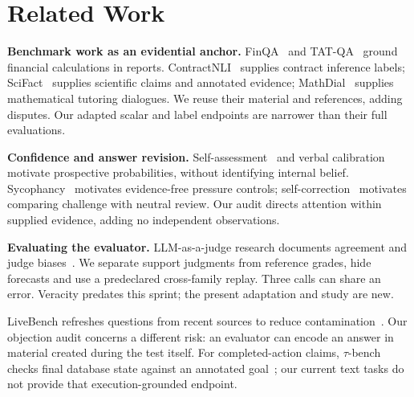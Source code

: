 \section{Related Work}
\label{sec:related-work}
\textbf{Benchmark work as an evidential anchor.}
FinQA~\cite{chen2021} and TAT-QA~\cite{zhu2021} ground financial calculations
in reports. ContractNLI~\cite{koreeda2021} supplies contract inference labels;
SciFact~\cite{wadden2020} supplies scientific claims and annotated evidence;
MathDial~\cite{macina2023} supplies mathematical tutoring dialogues. We reuse
their material and references, adding disputes. Our adapted scalar and label
endpoints are narrower than their full evaluations.

\textbf{Confidence and answer revision.}
Self-assessment~\cite{kadavath2022} and verbal calibration~\cite{tian2023}
motivate prospective probabilities, without identifying internal belief.
Sycophancy~\cite{sharma2024} motivates evidence-free pressure controls;
self-correction~\cite{huang2024} motivates comparing challenge with neutral
review. Our audit directs attention within supplied evidence, adding no
independent observations.

\textbf{Evaluating the evaluator.}
LLM-as-a-judge research documents agreement and judge biases~\cite{zheng2023}.
We separate support judgments from reference grades, hide forecasts and
use a predeclared cross-family replay. Three calls can share an error. Veracity
predates this sprint; the present adaptation and study are new.

LiveBench refreshes questions from recent sources to reduce
contamination~\cite{white2024}. Our objection audit concerns a different risk:
an evaluator can encode an answer in material created during the test itself.
For completed-action claims, $\tau$-bench checks final database state against
an annotated goal~\cite{yao2024}; our current text tasks do not provide that
execution-grounded endpoint.

